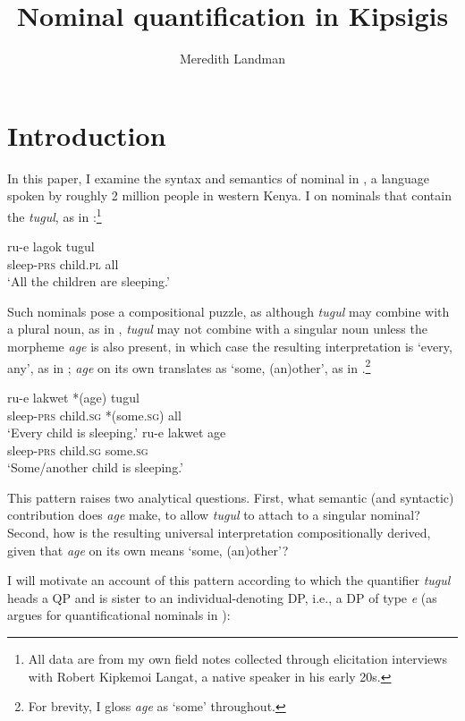 \documentclass[output=paper]{LSP/langsci}
\author{Meredith Landman \affiliation{Pomona College}}
\title{Nominal quantification in Kipsigis}
\begin{document}
\section{Introduction}\label{sec:landman:introduction}

In this paper, I examine the syntax and semantics of nominal  in , a  language spoken by roughly 2 million people in western Kenya. I  on nominals that contain the  \textit{tugul}, as in :\footnote{All data are from my own field notes collected through elicitation interviews with Robert Kipkemoi Langat, a native  speaker in his early 20s.}

\ea \label{ex:landman:1}
	\gll ru-e lagok tugul\\
       	 sleep-\textsc{prs} child.\textsc{pl} all\\
  \glt ‘All the children are sleeping.’
\z

\noindent Such nominals pose a compositional puzzle, as although \textit{tugul} may combine with a plural noun, as in , \textit{tugul} may not combine with a singular noun unless the morpheme \textit{age} is also present, in which case the resulting interpretation is ‘every, any’, as in ; \textit{age} on its own translates as ‘some, (an)other’, as in .\footnote{For brevity, I gloss \textit{age} as ‘some’ throughout.}

\ea
  \ea \label{ex:landman:2a}
    \gll ru-e lakwet *(age) tugul\\
       sleep-\textsc{prs} child.\textsc{sg} *(some.\textsc{sg}) all\\
    \glt ‘Every child is sleeping.’
  \ex \label{ex:landman:2b}
    \gll ru-e lakwet age\\
       	 sleep-\textsc{prs} child.\textsc{sg} some.\textsc{sg}\\
    \glt ‘Some/another child is sleeping.’
  \z
\z

\noindent This pattern raises two analytical questions. First, what semantic (and syntactic) contribution does \textit{age} make, to allow \textit{tugul} to attach to a singular nominal? Second, how is the resulting universal interpretation compositionally derived, given that \textit{age} on its own means ‘some, (an)other’?

I will motivate an account of this pattern according to which the quantifier \textit{tugul} heads a QP and is sister to an individual-denoting DP, i.e., a DP of type \textit{e} (as \citealt{Matthewson:2001} argues for quantificational nominals in ):
\end{document}
